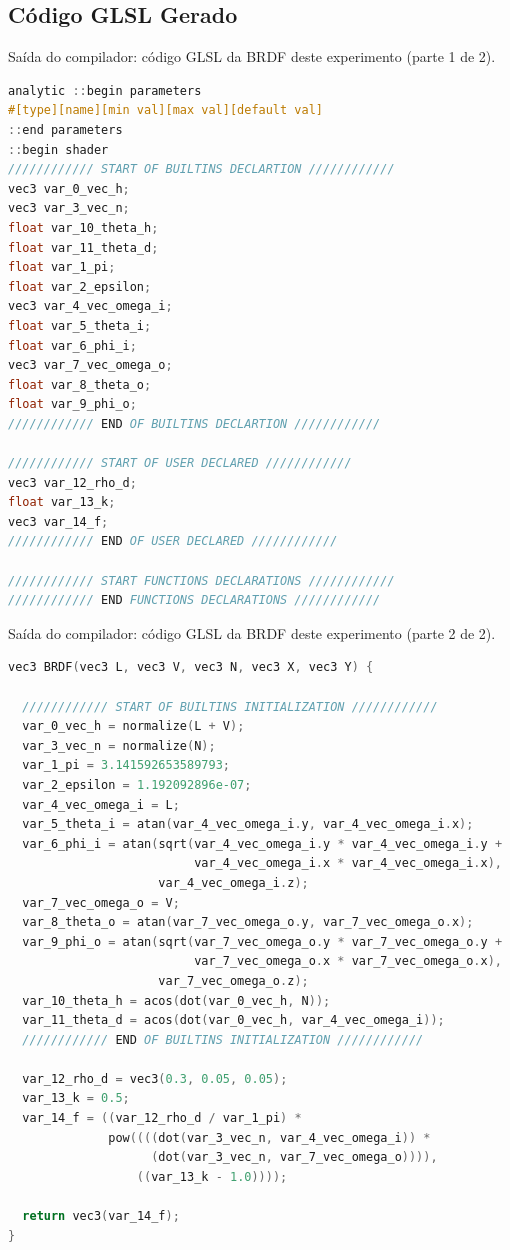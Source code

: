\subsection{Código GLSL Gerado}
\begin{codigo}[H]
    \caption{\small Saída do compilador: código GLSL da BRDF deste experimento (parte 1 de 2).}
    \label{cod-minnaert-glsl-pt-1}
\begin{lstlisting}[language=C, inputencoding=utf8]
analytic ::begin parameters
#[type][name][min val][max val][default val]
::end parameters
::begin shader
//////////// START OF BUILTINS DECLARTION ////////////
vec3 var_0_vec_h;
vec3 var_3_vec_n;
float var_10_theta_h;
float var_11_theta_d;
float var_1_pi;
float var_2_epsilon;
vec3 var_4_vec_omega_i;
float var_5_theta_i;
float var_6_phi_i;
vec3 var_7_vec_omega_o;
float var_8_theta_o;
float var_9_phi_o;
//////////// END OF BUILTINS DECLARTION ////////////

//////////// START OF USER DECLARED ////////////
vec3 var_12_rho_d;
float var_13_k;
vec3 var_14_f;
//////////// END OF USER DECLARED ////////////

//////////// START FUNCTIONS DECLARATIONS ////////////
//////////// END FUNCTIONS DECLARATIONS ////////////
\end{lstlisting}
\end{codigo}

\begin{codigo}[H]
    \caption{\small Saída do compilador: código GLSL da BRDF deste experimento (parte 2 de 2).}
    \label{cod-minnaert-glsl-pt-2}
\begin{lstlisting}[language=C, inputencoding=utf8]
vec3 BRDF(vec3 L, vec3 V, vec3 N, vec3 X, vec3 Y) {

  //////////// START OF BUILTINS INITIALIZATION ////////////
  var_0_vec_h = normalize(L + V);
  var_3_vec_n = normalize(N);
  var_1_pi = 3.141592653589793;
  var_2_epsilon = 1.192092896e-07;
  var_4_vec_omega_i = L;
  var_5_theta_i = atan(var_4_vec_omega_i.y, var_4_vec_omega_i.x);
  var_6_phi_i = atan(sqrt(var_4_vec_omega_i.y * var_4_vec_omega_i.y +
                          var_4_vec_omega_i.x * var_4_vec_omega_i.x),
                     var_4_vec_omega_i.z);
  var_7_vec_omega_o = V;
  var_8_theta_o = atan(var_7_vec_omega_o.y, var_7_vec_omega_o.x);
  var_9_phi_o = atan(sqrt(var_7_vec_omega_o.y * var_7_vec_omega_o.y +
                          var_7_vec_omega_o.x * var_7_vec_omega_o.x),
                     var_7_vec_omega_o.z);
  var_10_theta_h = acos(dot(var_0_vec_h, N));
  var_11_theta_d = acos(dot(var_0_vec_h, var_4_vec_omega_i));
  //////////// END OF BUILTINS INITIALIZATION ////////////

  var_12_rho_d = vec3(0.3, 0.05, 0.05);
  var_13_k = 0.5;
  var_14_f = ((var_12_rho_d / var_1_pi) *
              pow((((dot(var_3_vec_n, var_4_vec_omega_i)) *
                    (dot(var_3_vec_n, var_7_vec_omega_o)))),
                  ((var_13_k - 1.0))));

  return vec3(var_14_f);
}
\end{lstlisting}
\end{codigo}
